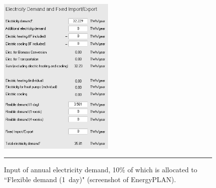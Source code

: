 \begin{figure}
	\centering
	\includegraphics[width=0.5\textwidth]{figures/B12_elec_dem.png}
	\rule{0.5\textwidth}{0.5pt} %
	\caption{Input of annual electricity demand, 10\% of which is allocated to ``Flexible demand (1~day)" (screenshot of EnergyPLAN).}
	\label{fig:B12_elec_dem}
\end{figure}